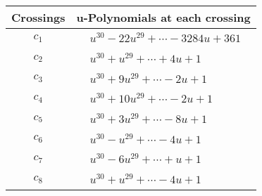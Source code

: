 \documentclass[1p]{elsarticle_modified}
\theoremstyle{definition}
\begin{document}
\begin{tabular}{m{50pt}|m{274pt}}
Crossings & \hspace{64pt}u-Polynomials at each crossing \\
\hline $$\begin{aligned}c_{1}\end{aligned}$$&$\begin{aligned}
&u^{30}-22 u^{29}+\cdots-3284 u+361
\end{aligned}$\\
\hline $$\begin{aligned}c_{2}\end{aligned}$$&$\begin{aligned}
&u^{30}+u^{29}+\cdots+4 u+1
\end{aligned}$\\
\hline $$\begin{aligned}c_{3}\end{aligned}$$&$\begin{aligned}
&u^{30}+9 u^{29}+\cdots-2 u+1
\end{aligned}$\\
\hline $$\begin{aligned}c_{4}\end{aligned}$$&$\begin{aligned}
&u^{30}+10 u^{29}+\cdots-2 u+1
\end{aligned}$\\
\hline $$\begin{aligned}c_{5}\end{aligned}$$&$\begin{aligned}
&u^{30}+3 u^{29}+\cdots-8 u+1
\end{aligned}$\\
\hline $$\begin{aligned}c_{6}\end{aligned}$$&$\begin{aligned}
&u^{30}- u^{29}+\cdots-4 u+1
\end{aligned}$\\
\hline $$\begin{aligned}c_{7}\end{aligned}$$&$\begin{aligned}
&u^{30}-6 u^{29}+\cdots+u+1
\end{aligned}$\\
\hline $$\begin{aligned}c_{8}\end{aligned}$$&$\begin{aligned}
&u^{30}+u^{29}+\cdots-4 u+1
\end{aligned}$\\

\end{tabular}
\end{document}
